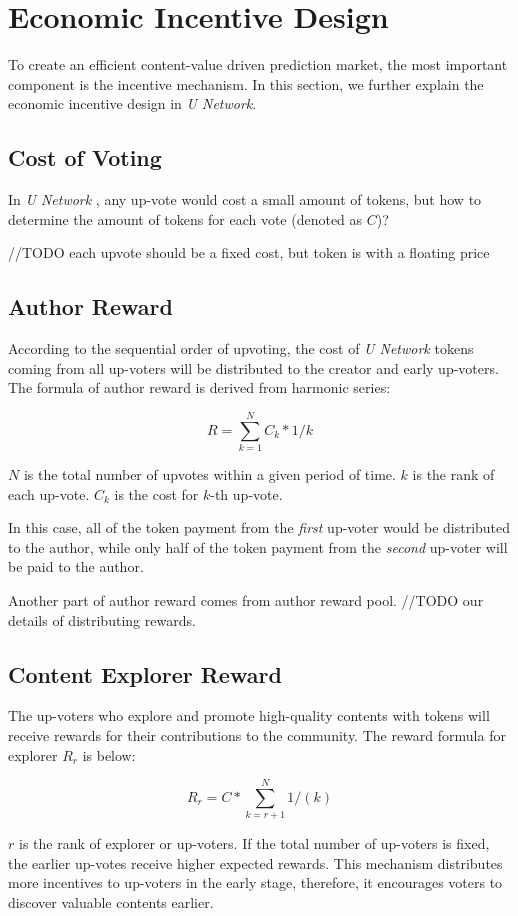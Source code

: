 \section{Economic Incentive Design}
To create an efficient content-value driven prediction market, the most important component is the incentive mechanism. In this section, we further explain the economic incentive design in \emph{U Network}.

\subsection{Cost of Voting}
In \emph{U Network} , any up-vote would cost a small amount of tokens, but how to determine the amount of tokens for each vote (denoted as $C$)? 

//TODO each upvote should be a fixed cost, but token is with a floating price  

\subsection{Author Reward}
According to the sequential order of upvoting, the cost of \emph{U Network} tokens coming from all up-voters will be distributed to the creator and early up-voters. The formula of author reward is derived from harmonic series: 
\begin{center}
$$R = \sum_{k=1}^{N}  C_{k} * 1/{k}$$
\end{center}
$N$ is the total number of upvotes within a given period of time. $k$ is the rank of each up-vote. $C_{k}$ is the cost for $k$-th up-vote. 

In this case, all of the token payment from the \emph{first} up-voter would be distributed to the author, while only half of the token payment from the \emph{second} up-voter will be paid to the author. 

Another part of author reward comes from author reward pool.
//TODO our details of distributing rewards.

\subsection{Content Explorer Reward}
The up-voters who explore and promote high-quality contents with tokens will receive rewards for their contributions to the community. The reward formula for explorer $R_r$ is below:
\begin{center}
$$R_r = C * \sum_{k=r+1}^{N} 1/{(k)}$$
\end{center}
$r$ is the rank of explorer or up-voters. If the total number of up-voters is fixed, the earlier up-votes receive higher expected rewards. This mechanism distributes more incentives to up-voters in the early stage, therefore, it encourages voters to discover valuable contents earlier.
 

